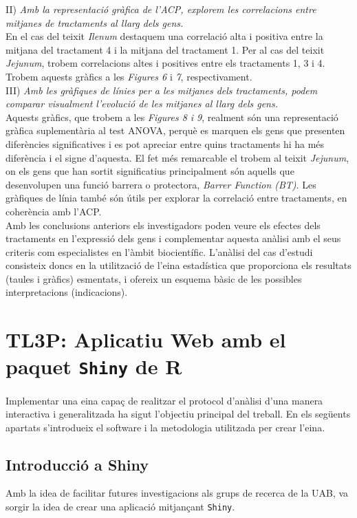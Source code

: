 \documentclass[english]{article}
\begin{document}
\noindent II)\textit{ Amb la representació gràfica de l'ACP, explorem les correlacions entre mitjanes de tractaments al llarg dels gens.}
\\

En el cas del teixit \textit{Ilenum} destaquem una correlació alta i positiva entre la mitjana del tractament 4 i la mitjana del tractament 1. Per al cas del teixit \textit{Jejunum}, trobem correlacions altes i positives entre els tractaments 1, 3 i 4. Trobem aquests gràfics a les \textit{Figures 6} i \textit{7}, respectivament.
\\

\noindent III)\textit{ Amb les gràfiques de línies per a les mitjanes dels tractaments, podem comparar
visualment l'evolució de les mitjanes al llarg dels gens.}
\\

Aquests gràfics, que trobem a les \textit{Figures 8 i 9}, realment són una representació gràfica suplementària al test ANOVA, perquè es marquen els gens que presenten diferències significatives i es pot apreciar entre quins tractaments hi ha més diferència i el signe d'aquesta. El fet més remarcable el trobem al teixit \textit{Jejunum}, on els gens que han sortit significatius principalment són aquells que desenvolupen una funció barrera o protectora, \emph{Barrer Function (BT)}. Les gràfiques de línia també són útils per explorar la correlació entre tractaments, en coherència amb l'ACP.
\\

Amb les conclusions anteriors els investigadors poden veure els efectes dels tractaments en l'expressió dels gens i complementar aquesta anàlisi amb el seus criteris com especialistes en l'àmbit biocientífic. L'anàlisi del cas d'estudi consisteix doncs en la utilització de l'eina estadística que proporciona els resultats (taules i gràfics) esmentats, i ofereix un esquema bàsic de les possibles interpretacions (indicacions).

\clearpage
\section{TL3P: Aplicatiu Web amb el paquet \texttt{Shiny} de R}
Implementar una eina capa\c{c} de realitzar el protocol d'anàlisi d'una manera interactiva i generalitzada ha sigut l'objectiu principal del treball. En els següents apartats s'introdueix el software i la metodologia utilitzada per crear l'eina.
\subsection{Introducció a Shiny}
Amb la idea de facilitar futures investigacions als grups de recerca de la UAB, va sorgir la idea de crear una aplicació mitjan\c{c}ant \texttt{Shiny}.
\\
\end{document}
